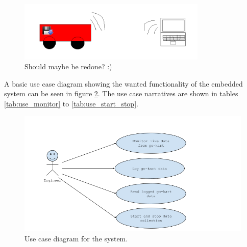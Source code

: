 \begin{figure}[h]
 	\centering
    \includegraphics[width=0.8\textwidth]{graphics/go_kart_network_simple}
    \caption{Should maybe be redone? :)}
    \label{fig:simple}
\end{figure}

A basic use case diagram showing the wanted functionality of the embedded system can be seen in figure \ref{fig:use_cases}.
The use case narratives are shown in tables \ref{tab:use_monitor} to \ref{tab:use_start_stop}.


\begin{figure}[h]
 	\centering
    \includegraphics[width=1\textwidth]{graphics/use_cases.png}
    \caption{Use case diagram for the system.}
    \label{fig:use_cases}
\end{figure}

